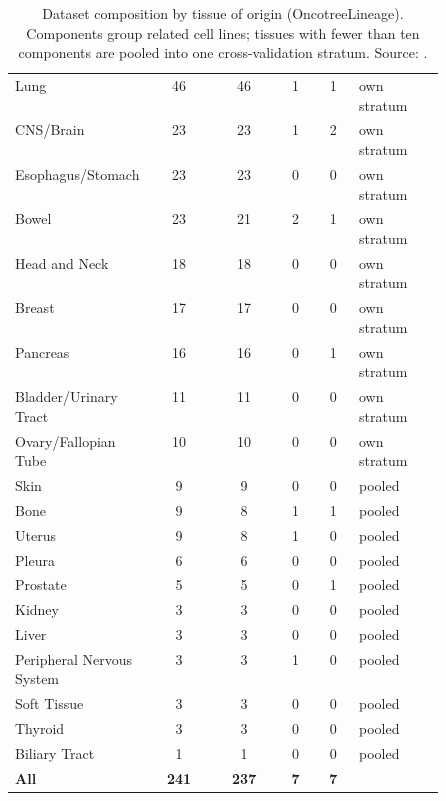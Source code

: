\begin{table}[tbp]
  \caption[Dataset composition by tissue]{Dataset composition by tissue of origin
    (OncotreeLineage). Components group related cell lines; tissues with fewer than ten
    components are pooled into one cross-validation stratum. Source:
    .}
  \label{tab:composition}
  \small
  \begin{tabular}{@{}L{0.30\linewidth}S[table-format=2.0]S[table-format=3.0]S[table-format=1.0]S[table-format=1.0]L{0.20\linewidth}@{}}
    \toprule
     & {} & {}
      & {} & {} &  \\
    \midrule
    Lung & 46 & 46 & 1 & 1 & own stratum \\
    CNS/Brain & 23 & 23 & 1 & 2 & own stratum \\
    Esophagus/Stomach & 23 & 23 & 0 & 0 & own stratum \\
    Bowel & 23 & 21 & 2 & 1 & own stratum \\
    Head and Neck & 18 & 18 & 0 & 0 & own stratum \\
    Breast & 17 & 17 & 0 & 0 & own stratum \\
    Pancreas & 16 & 16 & 0 & 1 & own stratum \\
    Bladder/Urinary Tract & 11 & 11 & 0 & 0 & own stratum \\
    Ovary/Fallopian Tube & 10 & 10 & 0 & 0 & own stratum \\
    \addlinespace
    Skin & 9 & 9 & 0 & 0 & pooled \\
    Bone & 9 & 8 & 1 & 1 & pooled \\
    Uterus & 9 & 8 & 1 & 0 & pooled \\
    Pleura & 6 & 6 & 0 & 0 & pooled \\
    Prostate & 5 & 5 & 0 & 1 & pooled \\
    Kidney & 3 & 3 & 0 & 0 & pooled \\
    Liver & 3 & 3 & 0 & 0 & pooled \\
    Peripheral Nervous System & 3 & 3 & 1 & 0 & pooled \\
    Soft Tissue & 3 & 3 & 0 & 0 & pooled \\
    Thyroid & 3 & 3 & 0 & 0 & pooled \\
    Biliary Tract & 1 & 1 & 0 & 0 & pooled \\
    \midrule
    \textbf{All} & \bfseries 241 & \bfseries 237 & \bfseries 7 & \bfseries 7 & \\
    \bottomrule
  \end{tabular}
\end{table}

